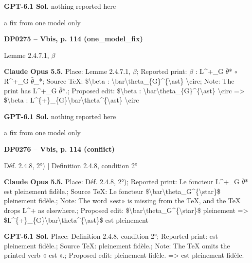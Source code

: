 \textbf{GPT-6.1 Sol.} nothing reported here\par
a fix from one model only\par
\par\noindent\hypertarget{DP0275}{}\textbf{DP0275 -- Vbis, p. 114 (one\_model\_fix)}\par
Lemme 2.4.7.1, \ensuremath{\beta}\par
\textbf{Claude Opus 5.5.} Place: Lemme 2.4.7.1, \ensuremath{\beta}; Reported print: \ensuremath{\beta} : L\textasciicircum{}+\_G \ensuremath{\bar{\theta}}* \ensuremath{\circ} R\textasciicircum{}+\_G \ensuremath{\bar{\theta}}\_*; Source TeX: \$\textbackslash{}beta : \textbackslash{}bar\textbackslash{}theta\_\{G\}\textasciicircum{}\{\textbackslash{}ast\} \textbackslash{}circ; Note: The print has L\textasciicircum{}+\_G \ensuremath{\bar{\theta}}*.; Proposed edit: \$\textbackslash{}beta : \textbackslash{}bar\textbackslash{}theta\_\{G\}\textasciicircum{}\{\textbackslash{}ast\} \textbackslash{}circ =\allowbreak > \$\textbackslash{}beta : L\textasciicircum{}\{+\}\_\{G\}\textbackslash{}bar\textbackslash{}theta\textasciicircum{}\{\textbackslash{}ast\} \textbackslash{}circ\par
\textbf{GPT-6.1 Sol.} nothing reported here\par
a fix from one model only\par
\par\noindent\hypertarget{DP0276}{}\textbf{DP0276 -- Vbis, p. 114 (conflict)}\par
Déf. 2.4.8, 2°) | Definition 2.4.8, condition 2°\par
\textbf{Claude Opus 5.5.} Place: Déf. 2.4.8, 2°); Reported print: Le foncteur L\textasciicircum{}+\_G \ensuremath{\bar{\theta}}* est pleinement fidèle.; Source TeX: Le foncteur \$\textbackslash{}bar\textbackslash{}theta\_G\textasciicircum{}\{\textbackslash{}star\}\$ pleinement fidèle.; Note: The word «est» is missing from the TeX, and the TeX drops L\textasciicircum{}+ as elsewhere.; Proposed edit: \$\textbackslash{}bar\textbackslash{}theta\_G\textasciicircum{}\{\textbackslash{}star\}\$ pleinement =\allowbreak > \$L\textasciicircum{}\{+\}\_\{G\}\textbackslash{}bar\textbackslash{}theta\textasciicircum{}\{\textbackslash{}ast\}\$ est pleinement\par
\textbf{GPT-6.1 Sol.} Place: Definition 2.4.8, condition 2°; Reported print: est pleinement fidèle.; Source TeX: pleinement fidèle.; Note: The TeX omits the printed verb « est ».; Proposed edit: pleinement fidèle. =\allowbreak > est pleinement fidèle.\par
